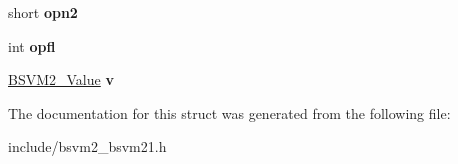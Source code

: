 \begin{DoxyCompactItemize}
\item 
\hypertarget{structBSVM2__Opcode__s_ac2e7b69b49c9edabf1281470eae258b1}{short {\bfseries opn2}}\label{structBSVM2__Opcode__s_ac2e7b69b49c9edabf1281470eae258b1}

\item 
\hypertarget{structBSVM2__Opcode__s_ab29803a0e9e592a7215397915e071761}{int {\bfseries opfl}}\label{structBSVM2__Opcode__s_ab29803a0e9e592a7215397915e071761}

\item 
\hypertarget{structBSVM2__Opcode__s_a30cc8b17f42c6fe6180a3aa5e9f95c3f}{\hyperlink{unionBSVM2__Value__u}{B\-S\-V\-M2\-\_\-\-Value} {\bfseries v}}\label{structBSVM2__Opcode__s_a30cc8b17f42c6fe6180a3aa5e9f95c3f}

\end{DoxyCompactItemize}


The documentation for this struct was generated from the following file\-:\begin{DoxyCompactItemize}
\item 
include/bsvm2\-\_\-bsvm21.\-h\end{DoxyCompactItemize}
